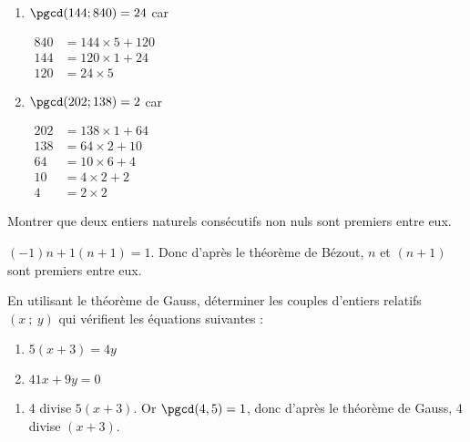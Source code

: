 \documentclass{cornouaille}
\begin{document}
\begin{colonne*exercice}
\begin{corrige}
\begin{enumerate}
  \item $\pgcd(144;840)=24$ car
    
    $\begin{aligned}
      840&=144\times5+120\\
      144&=120\times1+24\\
      120&=24\times5\end{aligned}$\medskip
    
    
    
  \item $\pgcd(202;138)=2$ car

    $\begin{aligned}
      202&=138\times1+64\\
      138&=64\times2+10\\
      64&=10\times6+4\\
      10&=4\times2+2\\
      4&=2\times2\end{aligned}$
    

    
  \end{enumerate}
\end{corrige}

\begin{exercice*}
  Montrer que deux entiers naturels consécutifs non nuls sont premiers
  entre eux.
\end{exercice*}
\begin{corrige}
  $(-1)n+1(n+1)=1$. Donc d'après le théorème de Bézout, $n$ et $(n+1)$
  sont premiers entre eux.
\end{corrige}

\begin{exercice*}
En utilisant le théorème de Gauss, déterminer les couples d’entiers
relatifs $(x\ ;\ y)$ qui vérifient les équations suivantes :

\vspace{-2mm}
\begin{multicols}{2}
\begin{enumerate}
\item $5(x+3)=4y$
\item $41x+9y=0$
\end{enumerate}
\end{multicols}
\end{exercice*}
\begin{corrige}
  \begin{enumerate}
  \item 4 divise $5(x+3)$. Or $\pgcd(4,5)=1$, donc d'après le théorème
    de Gauss, 4 divise $(x+3)$.


\end{enumerate}
\end{corrige}
\end{colonne*exercice}
\end{document}
